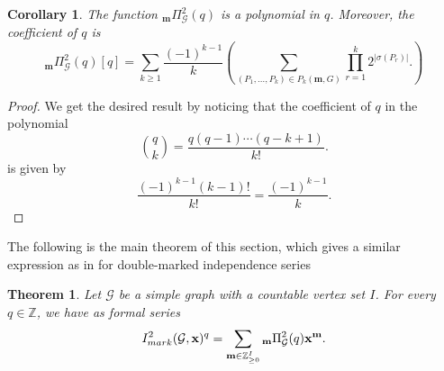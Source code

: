 \documentclass[11pt,reqno]{amsart}
\numberwithin{equation}{section} %
\newtheorem{thm}{Theorem}
\newtheorem{cor}{Corollary}
\theoremstyle{definition}
\theoremstyle{remark}
\numberwithin{equation}{section}
\begin{document}
\begin{cor}
The function $_{\mathbf{m}}\Pi_\mathcal{G}^{2}( q)$ is a polynomial in \(q\). Moreover, the
coefficient of \(q\) is
$$
_{\mathbf{m}}\Pi_\mathcal{G}^{2}( q)[q]
=
\sum_{k\ge1}\frac{(-1)^{k-1}}{k}\left(
\sum_{(P_1,\ldots,P_k)\in P_k(\mathbf m,G)}
\prod_{r=1}^k 2^{|\sigma(P_r)|}.\right)
$$
\end{cor}

\begin{proof} We get the desired result by noticing that  the coefficient of \(q\) in the  polynomial
    \[
\binom qk
=
\frac{q(q-1)\cdots(q-k+1)}{k!}.
\]
 is given by
\[
\frac{(-1)^{k-1}(k-1)!}{k!}
=
\frac{(-1)^{k-1}}{k}.
\]
\end{proof}

The following is the main theorem of this section, which gives a similar expression as in  \cite[Theorem 1]{CDV} for double-marked independence series
\begin{thm}
Let $\mathcal{G}$ be a simple graph with a countable vertex set $I$. For every \(q\in \mathbb{Z}\), we have as formal series
$$ I_{mark}^2(\mathcal{G}, \bold x)^q =
\sum_{\mathbf {m}\in\mathbb{Z}_{\ge0}^{I}} {_\mathbf{m}}\Pi_\mathcal G^{2}(q)\mathbf x^{\mathbf m}.
$$

\end{thm}
\end{document}

